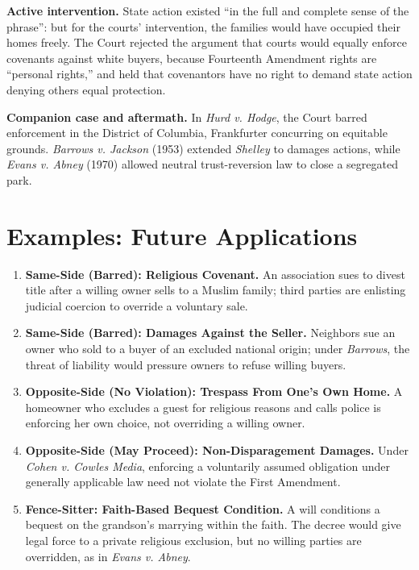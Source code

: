 \documentclass[12pt]{article}
\begin{document}
\textbf{Active intervention.} State action existed ``in the full and complete sense of the phrase'': but for the courts' intervention, the families would have occupied their homes freely. The Court rejected the argument that courts would equally enforce covenants against white buyers, because Fourteenth Amendment rights are ``personal rights,'' and held that covenantors have no right to demand state action denying others equal protection.

\textbf{Companion case and aftermath.} In \textit{Hurd v. Hodge}, the Court barred enforcement in the District of Columbia, Frankfurter concurring on equitable grounds. \textit{Barrows v. Jackson} (1953) extended \textit{Shelley} to damages actions, while \textit{Evans v. Abney} (1970) allowed neutral trust-reversion law to close a segregated park.

\section{Examples: Future Applications}

\begin{enumerate}
\item \textbf{Same-Side (Barred): Religious Covenant.} An association sues to divest title after a willing owner sells to a Muslim family; third parties are enlisting judicial coercion to override a voluntary sale.
\item \textbf{Same-Side (Barred): Damages Against the Seller.} Neighbors sue an owner who sold to a buyer of an excluded national origin; under \textit{Barrows}, the threat of liability would pressure owners to refuse willing buyers.
\item \textbf{Opposite-Side (No Violation): Trespass From One's Own Home.} A homeowner who excludes a guest for religious reasons and calls police is enforcing her own choice, not overriding a willing owner.
\item \textbf{Opposite-Side (May Proceed): Non-Disparagement Damages.} Under \textit{Cohen v. Cowles Media}, enforcing a voluntarily assumed obligation under generally applicable law need not violate the First Amendment.
\item \textbf{Fence-Sitter: Faith-Based Bequest Condition.} A will conditions a bequest on the grandson's marrying within the faith. The decree would give legal force to a private religious exclusion, but no willing parties are overridden, as in \textit{Evans v. Abney}.
\end{enumerate}
\end{document}
